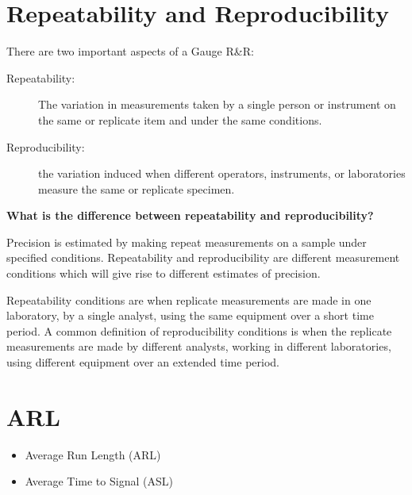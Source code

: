\documentclass[]{article}
\begin{document}
 
\section{Repeatability and Reproducibility}
There are two important aspects of a Gauge R\&R:
\begin{description}
\item[Repeatability:] The variation in measurements taken by a single person or instrument on the same or replicate item and under the same conditions.
\item[Reproducibility:] the variation induced when different operators, instruments, or laboratories measure the same or replicate specimen.
\end{description}
\textbf{What is the difference between repeatability and reproducibility?}

Precision is estimated by making repeat measurements on a sample under specified conditions. Repeatability and reproducibility are different measurement conditions which will give rise to different estimates of precision. 

Repeatability conditions are when replicate measurements are made in one laboratory, by a single analyst, using the same equipment over a short time period. A common definition of reproducibility conditions is when the replicate measurements are made by different analysts, working in different laboratories, using different equipment over an extended time period.


\section{ARL}
\begin{itemize}
\item Average Run Length (ARL)
\item Average Time to Signal (ASL)
\end{itemize}
\end{document}
